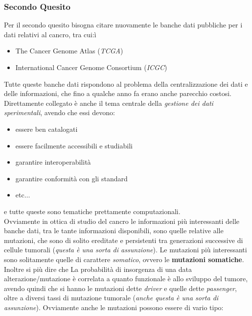 \documentclass[a4paper,12pt, oneside]{book}
\begin{document}
\subsubsection{Secondo Quesito}
Per il secondo quesito bisogna citare nuovamente le banche dati pubbliche per i
dati relativi al cancro, tra cui:ì
\begin{itemize}
  \item The Cancer Genome Atlas (\textit{TCGA})
  \item International Cancer Genome Consortium (\textit{ICGC})
\end{itemize}
Tutte queste banche dati rispondono al problema della centralizzazione dei dati
e delle informazioni, che fino a qualche anno fa erano anche parecchio
costosi.\\
Direttamente collegato è anche il tema centrale della \textit{gestione dei dati
  sperimentali}, avendo che essi devono:
\begin{itemize}
  \item essere ben catalogati
  \item essere facilmente accessibili e studiabili
  \item garantire interoperabilità
  \item garantire conformità con gli standard
  \item etc$\ldots$
\end{itemize}
e tutte queste sono tematiche prettamente computazionali.\\
Ovviamente in ottica di studio del cancro le informazioni più interessanti delle
banche dati, tra le tante informazioni disponibili, sono quelle relative alle
mutazioni, che sono di solito ereditate e persistenti tra generazioni successive
di cellule tumorali (\textit{questa è una sorta di assunzione}). Le mutazioni
più interessanti sono solitamente quelle di carattere \textit{somatico}, ovvero
le \textbf{mutazioni somatiche}. Inoltre si più dire che La probabilità di
insorgenza di una data alterazione/mutazione è correlata a quanto funzionale è
allo sviluppo del tumore, avendo quindi che si hanno le mutazioni dette
\textit{driver} e quelle dette \textit{passenger}, oltre a diversi tassi di
mutazione tumorale (\textit{anche questa è una sorta di assunzione}). Ovviamente
anche le mutazioni possono essere di vario tipo:
\end{document}
